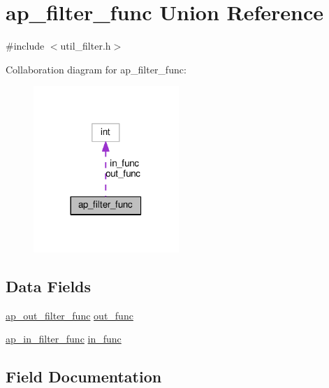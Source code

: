 \hypertarget{unionap__filter__func}{}\section{ap\+\_\+filter\+\_\+func Union Reference}
\label{unionap__filter__func}


{\ttfamily \#include $<$util\+\_\+filter.\+h$>$}



Collaboration diagram for ap\+\_\+filter\+\_\+func\+:
\nopagebreak
\begin{figure}[H]
\begin{center}
\leavevmode
\includegraphics[width=156pt]{unionap__filter__func__coll__graph}
\end{center}
\end{figure}
\subsection*{Data Fields}
\begin{DoxyCompactItemize}
\item 
\hyperlink{group__APACHE__CORE__FILTER_ga5c80541a5a1dcc9a383e90aa82be59b3}{ap\+\_\+out\+\_\+filter\+\_\+func} \hyperlink{unionap__filter__func_a225026b71249db645ec7e7d06d7240d9}{out\+\_\+func}
\item 
\hyperlink{group__APACHE__CORE__FILTER_ga8e6e76deedf9ef3e3a4aa33419663875}{ap\+\_\+in\+\_\+filter\+\_\+func} \hyperlink{unionap__filter__func_a83be4d45d8c5dc85ad72ef578877a01f}{in\+\_\+func}
\end{DoxyCompactItemize}


\subsection{Field Documentation}
